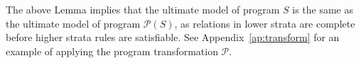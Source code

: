 

The above Lemma implies that the ultimate model of \plang program $S$ is the same as the ultimate model of \lang program $\mathcal{P}(S)$, as relations in lower strata are complete before higher strata rules are satisfiable.  See Appendix~\ref{ap:transform} for an example of applying the program transformation $\mathcal{P}$.





